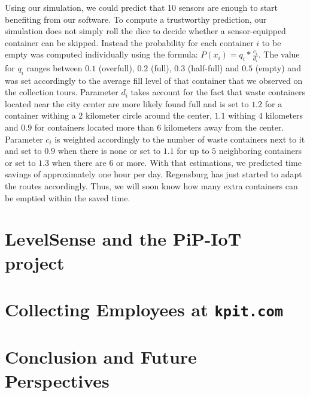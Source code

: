 \documentclass[10pt]{article}
\begin{document}
Using our simulation, we could predict that 10 sensors are enough to start
benefiting from our software. To compute a trustworthy prediction, our simulation
does not simply roll the dice to decide whether a sensor-equipped container can
be skipped. Instead the probability for each container $i$ to be empty was 
computed individually using the formula: $P(x_i)=q_i* \frac{c_i}{d_i}$. The value for 
$q_i$ ranges between $0.1$ (overfull), $0.2$ (full), $0.3$ (half-full) and $0.5$ (empty)
and was set accordingly to the average fill level of that container that we observed on
the collection tours. Parameter $d_i$ takes account for the fact that waste containers 
located near the city center are more likely found full and is set to $1.2$ for a container
withing a $2$ kilometer circle around the center, $1.1$ withing $4$ kilometers and $0.9$ for 
containers located more than $6$ kilometers away from the center. Parameter $c_i$ is weighted 
accordingly to the number of waste containers next to it and set to $0.9$ when there is none or
set to $1.1$ for up to $5$ neighboring containers or set to $1.3$ when there are $6$ or more.
With that estimations, we predicted time savings of approximately one hour per day.
Regensburg has just started to adapt the routes accordingly. Thus, we will soon
know how many extra containers can be emptied within the saved time.

\section{LevelSense and the PiP-IoT project}
\label{sec:Christchurch}

\blindtext

\section{Collecting Employees at {\tt kpit.com}}
\label{sec:Pune}

\blindtext

\section{Conclusion and Future Perspectives}
\label{sec:concl}

\blindtext






\end{document}
